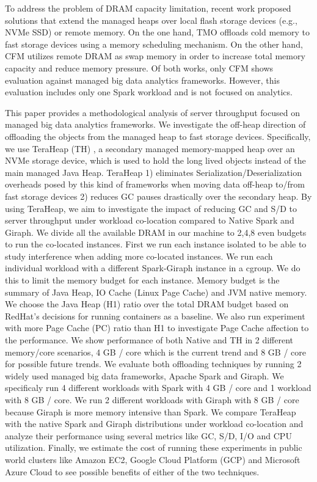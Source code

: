 To address the problem of DRAM capacity limitation, recent work
proposed solutions that extend the managed heaps over local flash
storage devices (e.g., NVMe SSD) or remote memory. On the one hand,
TMO \cite{TMO} offloads cold memory to fast storage devices using
a memory scheduling mechanism. On the other hand, CFM \cite{CFM}
utilizes remote DRAM as swap memory in order to increase total memory capacity
and reduce memory pressure. Of both works, only CFM shows
evaluation against managed big data analytics frameworks. However, this evaluation
includes only one Spark workload and is not focused on analytics.

This paper provides a methodological analysis of server throughput 
focused on managed big data analytics frameworks.
We investigate the off-heap direction of offloading the objects from the
managed heap to fast storage devices.
Specifically, we use TeraHeap (TH) \cite{TeraHeap}, a secondary managed
memory-mapped heap over an NVMe storage device, which is used to hold
the long lived objects instead of the main managed Java Heap. TeraHeap
1) eliminates Serialization/Deserialization overheads posed by this
kind of frameworks when moving data off-heap to/from fast storage
devices 2) reduces GC pauses drastically over the secondary heap. By
using TeraHeap, we aim to investigate the impact of reducing GC and S/D
to server throughput under workload co-location compared to Native Spark
and Giraph. We divide all the available DRAM
in our machine to 2,4,8 even budgets to run the co-located instances.
First we run each instance isolated to be able to study interference when adding more
co-located instances. We run each individual workload with a different Spark-Giraph instance in a cgroup.
We do this to limit the memory budget for each instance. Memory budget is
the summary of Java Heap, IO Cache (Linux Page Cache) and JVM native memory. We choose
the Java Heap (H1) ratio over the total DRAM budget based on RedHat's decisions
for running containers as a baseline. We also run experiment with more Page Cache (PC) ratio than H1
to investigate Page Cache affection to the performance. We show performance of both Native and TH in 2 different
memory/core scenarios, 4 GB / core which is the current trend and 8 GB / core 
for possible future trends. We evaluate both offloading techniques by running 2 widely used
managed big data frameworks, Apache Spark and Giraph. We
specificaly run 4 different workloads with Spark with 4 GB / core and 1 workload with 8 GB / core.
We run 2 different workloads with Giraph with 8 GB / core because Giraph is more memory intensive than Spark.
We compare TeraHeap with the native Spark and Giraph distributions under workload
co-location and analyze their performance using several metrics like
GC, S/D, I/O and CPU utilization. Finally, we estimate the cost of running these
experiments in public world clusters like Amazon EC2, Google Cloud Platform (GCP)
and Microsoft Azure Cloud to see possible benefits of either of the two techniques.

